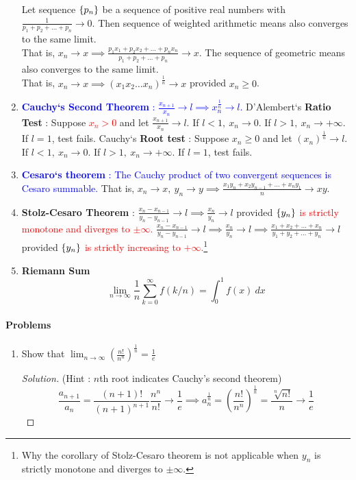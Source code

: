 \begin{enumerate}
	\subitem Let sequence $\{p_n\}$ be a sequence of positive real numbers with $\frac{1}{p_1+p_2+\dots+p_n} \to 0$. Then sequence of weighted arithmetic means also converges to the same limit.\\ That is, $x_n \to x \implies \frac{p_1x_1 + p_2x_2 + \dots + p_nx_n}{p_1+p_2+\dots+p_n} \to x$.
		\subitem The sequence of geometric means also converges to the same limit.\\ That is, $x_n \to x \implies (x_1x_2\dots x_n)^\frac{1}{n} \to x$ provided $x_n \ge 0$.
	\item \textcolor{blue}{\textbf{Cauchy`s Second Theorem} : $ \frac{x_{n+1}}{x_n} \to l \implies x_n^\frac{1}{n} \to l$.}
		\subitem D'Alembert`s \textbf{Ratio Test} : Suppose \textcolor{red}{$x_n > 0$} and let $\frac{x_{n+1}}{x_n} \to l$.
		If $l < 1,\ x_n \to 0$. If $l > 1,\ x_n \to +\infty$. If $l = 1$, test fails.
		\subitem Cauchy`s \textbf{Root test} : Suppose $x_n \ge 0$ and let $ (x_n)^{\frac{1}{n}} \to l$.
		If $l < 1,\ x_n \to 0$. If $l > 1,\ x_n \to +\infty$. If $l = 1$, test fails.
	\item \textcolor{blue}{\textbf{Cesaro`s theorem} : The Cauchy product of two convergent sequences is Cesaro summable.} That is, $x_n \to x,\ y_n \to y \implies \frac{x_1y_n + x_2y_{n-1} + \dots + x_ny_1}{n} \to xy$.
	\item \textbf{Stolz-Cesaro Theorem} : $\frac{x_n-x_{n-1}}{y_n-y_{n-1}} \to l \implies \frac{x_n}{y_n} \to l$ provided \textcolor{red}{$\{y_n\}$ is strictly monotone and diverges to $\pm \infty$.}
		\subitem $\frac{x_n-x_{n-1}}{y_n-y_{n-1}} \to l \implies \frac{x_n}{y_n} \to l \implies \frac{x_1+x_2+\dots+x_n}{y_1+y_2+\dots+y_n} \to l$ provided \textcolor{red}{$\{y_n\}$ is strictly increasing to $+\infty$.}\footnote{Why the corollary of Stolz-Cesaro theorem is not applicable when $y_n$ is strictly monotone and diverges to $\pm \infty$.}
	\item \textbf{Riemann Sum}
		\[ \lim_{n \to \infty} \frac{1}{n} \sum_{k=0}^\infty f(k/n) = \int_0^1 f(x)\ dx \]
\end{enumerate}

\paragraph{Problems}
\begin{enumerate}
	\item Show that $\displaystyle \lim_{n \to \infty} \left( \frac{n!}{n^n} \right)^\frac{1}{n} = \frac{1}{e}$ 
		\begin{proof}[Solution] (Hint : $n$th root indicates Cauchy's second theorem)
			$$ \frac{a_{n+1}}{a_n} = \frac{(n+1)!}{(n+1)^{n+1}} \frac{n^n}{n!} \to \frac{1}{e} \implies a_n^\frac{1}{n} = \left(\frac{n!}{n^n}\right)^\frac{1}{n} = \frac{\sqrt[n]{n!}}{n} \to \frac{1}{e} $$
		\end{proof}
\end{enumerate}


